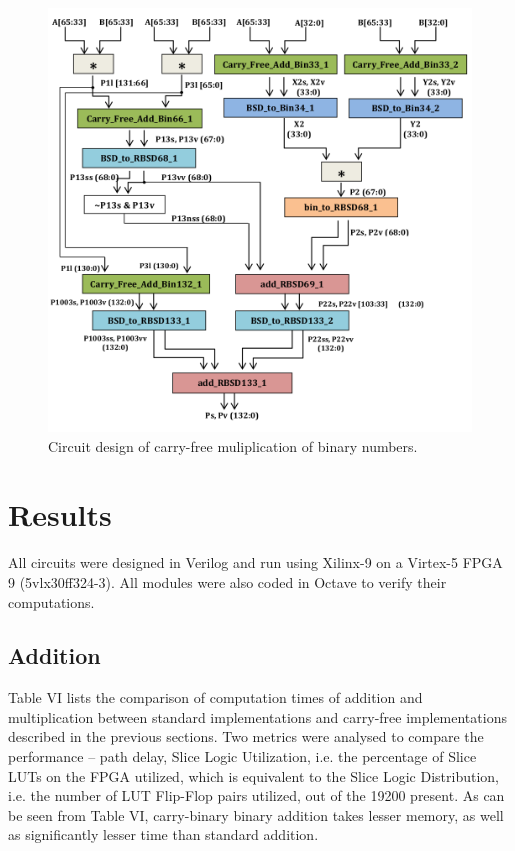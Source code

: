 \documentclass[conference]{IEEEtran_NCC}
\begin{document}
\begin{figure}[!t]
\centering
\includegraphics[width=\linewidth]{Mul.png}
\caption{Circuit design of carry-free muliplication of binary numbers.}
\label{fig_sim}
\end{figure}


\section{Results}

All circuits were designed in Verilog and run using Xilinx-9 on a Virtex-5 FPGA 9 (5vlx30ff324-3). All modules were also coded in Octave to verify their computations.

\subsection{Addition}

Table VI lists the comparison of computation times of addition and multiplication between standard implementations and carry-free implementations described in the previous sections. Two metrics were analysed to compare the performance – path delay, Slice Logic Utilization, i.e. the percentage of Slice LUTs on the FPGA utilized, which is equivalent to the Slice Logic Distribution, i.e. the number of LUT Flip-Flop pairs utilized, out of the 19200 present. As can be seen from Table VI, carry-binary binary addition takes lesser memory, as well as significantly lesser time than standard addition.
\end{document}
